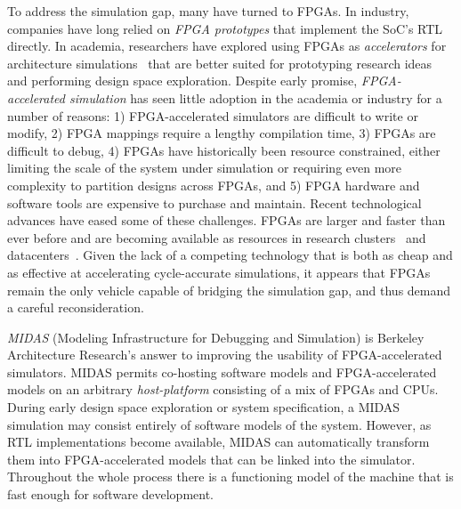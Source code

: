 To address the simulation gap, many have turned to FPGAs. In industry,
companies have long relied on \emph{FPGA prototypes} that implement the SoC's
RTL directly. In academia, researchers have explored using FPGAs as \emph{accelerators}
for architecture simulations~\cite{fast, fame, hasim, protoflex,ramp} that are
better suited for prototyping research ideas and performing design space
exploration. Despite early promise, \emph{FPGA-accelerated simulation} has seen
little adoption in the academia or industry for a number of reasons: 1)
FPGA-accelerated simulators are difficult to write or modify, 2) FPGA mappings
require a lengthy compilation time, 3) FPGAs are difficult to debug, 4) FPGAs
have historically been resource constrained, either limiting the scale of the
system under simulation or requiring even more complexity to partition designs
across FPGAs, and 5) FPGA hardware and software tools are expensive to purchase
and maintain.  Recent technological advances have eased some of these
challenges. FPGAs are larger and faster than ever before and are becoming
available as resources in research clusters~\cite{catapultannounce} and
datacenters~\cite{amazonf1}.  Given the lack of a competing technology that is
both as cheap and as effective at accelerating cycle-accurate simulations, it
appears that FPGAs remain the only vehicle capable of bridging the simulation
gap, and thus demand a careful reconsideration.

\emph{MIDAS} (Modeling Infrastructure for Debugging and Simulation) is Berkeley
Architecture Research's answer to improving the usability of FPGA-accelerated
simulators. MIDAS permits co-hosting software models and FPGA-accelerated
models on an arbitrary \emph{host-platform} consisting of a mix of FPGAs and
CPUs.  During early design space exploration or system specification, a MIDAS
simulation may consist entirely of software models of the system.  However, as
RTL implementations become available, MIDAS can automatically transform them
into FPGA-accelerated models that can be linked into the simulator. Throughout
the whole process there is a functioning model of the machine that is fast
enough for software development.

